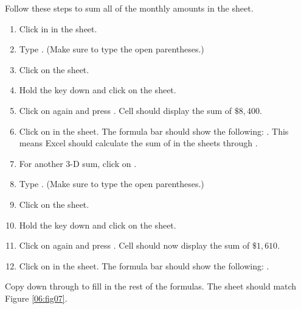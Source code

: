 Follow these steps to sum all of the monthly amounts in the  sheet.

\begin{enumerate}
	\item Click in  in the  sheet.
	\item Type . (Make sure to type the open parentheses.)
	\item Click on the  sheet.
	\item Hold the  key down and click on the  sheet.
	\item Click on  again and press . Cell  should display the sum of $ \$8,400 $.
	\item Click on  in the  sheet. The formula bar should show the following: . This means Excel should calculate the sum of  in the sheets  through .
	\item For another 3-D sum, click on .
	\item Type . (Make sure to type the open parentheses.)
	\item Click on the  sheet.
	\item Hold the  key down and click on the  sheet.
	\item Click on  again and press . Cell  should now display the sum of $ \$1,610 $.
	\item Click on  in the  sheet. The formula bar should show the following: .
\end{enumerate}

Copy  down through  to fill in the rest of the formulas. The  sheet should match Figure \ref{06:fig07}.

